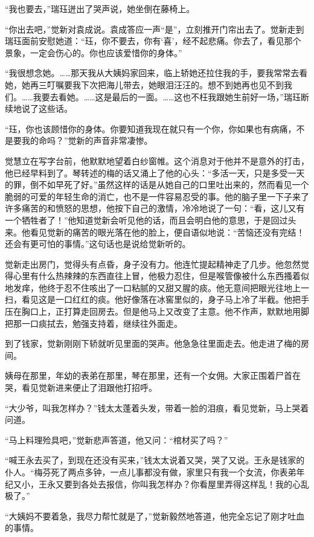 \par “我也要去，”瑞珏迸出了哭声说，她坐倒在藤椅上。
\par “你出去吧，”觉新对袁成说。袁成答应一声“是”，立刻推开门帘出去了。觉新走到瑞珏面前安慰她道：“珏，你不要去，你有‘喜’，经不起悲痛。你去了，看见那个景象，一定会伤心的。你也应该爱惜你的身体。”
\par “我很想念她。……那天我从大姨妈家回来，临上轿她还拉住我的手，要我常常去看她，她再三叮嘱要我下次把海儿带去，她眼泪汪汪的。想不到她再也见不到我们。……我要去看她。……这是最后的一面。……这也不枉我跟她生前好一场，”瑞珏断续地说了这些话。
\par “珏，你也该顾惜你的身体。你要知道我现在就只有一个你，你如果也有病痛，不是要我的命吗？”觉新的声音非常凄惨。
\par 觉慧立在写字台前，他默默地望着白纱窗帷。这个消息对于他并不是意外的打击，他已经早料到了。琴转述的梅的话又涌上了他的心头：“多活一天，只是多受一天的罪，倒不如早死了好。”虽然这样的话是从她自己的口里吐出来的，然而看见一个脆弱的可爱的年轻生命的消亡，也不是一件容易忍受的事。他的脑子里一下子来了许多痛苦的和愤怒的思想，他按下自己的激情，冷冷地说了一句：“看，这儿又有一个牺牲者了！”他知道觉新会听见他的话，而且会明白他的意思，于是回过头来。他看见觉新的痛苦的眼光落在他的脸上，便自语似地说：“苦恼还没有完结！还会有更可怕的事情。”这句话也是说给觉新听的。
\par 觉新走出房门，觉得头有点昏，身子没有力。他连忙提起精神走了几步。他忽然觉得心里有什么热辣辣的东西直往上冒，他极力忍住，但是喉管像被什么东西搔着似地发痒，他终于忍不住咳出了一口粘腻的又甜又腥的痰。他无意间把眼光往地上一扫，看见这是一口红红的痰。他好像落在冰窖里似的，身子马上冷了半截。他把手压在胸口上，正打算走回房去。但是他马上又改变了主意。他不作声，默默地用脚把那一口痰拭去，勉强支持着，继续往外面走。
\par 到了钱家，觉新刚刚下轿就听见里面的哭声。他急急往里面走去。他走进了梅的房间。
\par 姨母在那里，年幼的表弟在那里，琴在那里，还有一个女佣。大家正围着尸首在哭，看见觉新进来便止了泪跟他打招呼。
\par “大少爷，叫我怎样办？”钱太太蓬着头发，带着一脸的泪痕，看见觉新，马上哭着问道。
\par “马上料理殓具吧，”觉新悲声答道，他又问：“棺材买了吗？”
\par “喊王永去买了，到现在还没有买来，”钱太太说着又哭，哭了又说。王永是钱家的仆人。“梅芬死了两点多钟，一点儿事都没有做，家里只有我一个女流，你表弟年纪又小，王永又要到各处去报信，你叫我怎样办？你看屋里弄得这样乱！我的心乱极了。”
\par “大姨妈不要着急，我尽力帮忙就是了，”觉新毅然地答道，他完全忘记了刚才吐血的事情。
